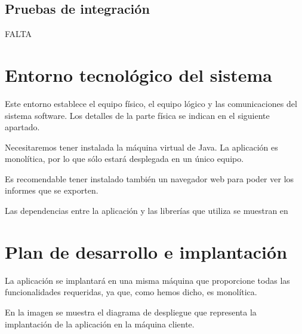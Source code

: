 \subsection{Pruebas de integración}
FALTA

\newpage

\section{Entorno tecnológico del sistema}
Este entorno establece el equipo físico, el equipo lógico y las comunicaciones del sistema software. Los detalles de la parte física se indican en el siguiente apartado.

Necesitaremos tener instalada la máquina virtual de Java. La aplicación es monolítica, por lo que sólo estará desplegada en un único equipo.

Es recomendable tener instalado también un navegador web para poder ver los informes que se exporten.

Las dependencias entre la aplicación y las librerías que utiliza se muestran en 




\section{Plan de desarrollo e implantación}
La aplicación se implantará en una misma máquina que proporcione todas las funcionalidades requeridas, ya que, como hemos dicho, es monolítica.

En la imagen  se muestra el diagrama de despliegue que representa la implantación de la aplicación en la máquina cliente.

